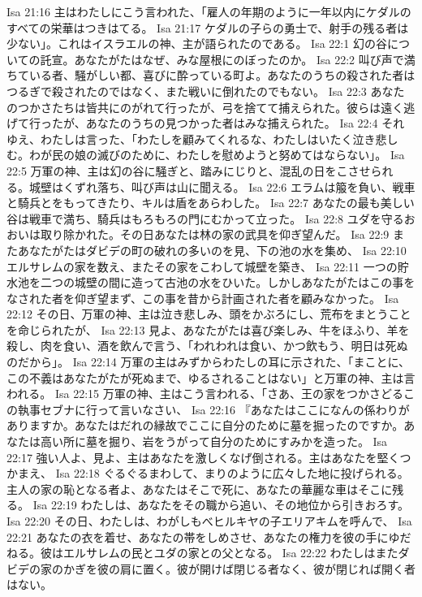 Isa 21:16  主はわたしにこう言われた、「雇人の年期のように一年以内にケダルのすべての栄華はつきはてる。
Isa 21:17  ケダルの子らの勇士で、射手の残る者は少ない」。これはイスラエルの神、主が語られたのである。
Isa 22:1  幻の谷についての託宣。あなたがたはなぜ、みな屋根にのぼったのか。
Isa 22:2  叫び声で満ちている者、騒がしい都、喜びに酔っている町よ。あなたのうちの殺された者はつるぎで殺されたのではなく、また戦いに倒れたのでもない。
Isa 22:3  あなたのつかさたちは皆共にのがれて行ったが、弓を捨てて捕えられた。彼らは遠く逃げて行ったが、あなたのうちの見つかった者はみな捕えられた。
Isa 22:4  それゆえ、わたしは言った、「わたしを顧みてくれるな、わたしはいたく泣き悲しむ。わが民の娘の滅びのために、わたしを慰めようと努めてはならない」。
Isa 22:5  万軍の神、主は幻の谷に騒ぎと、踏みにじりと、混乱の日をこさせられる。城壁はくずれ落ち、叫び声は山に聞える。
Isa 22:6  エラムは箙を負い、戦車と騎兵とをもってきたり、キルは盾をあらわした。
Isa 22:7  あなたの最も美しい谷は戦車で満ち、騎兵はもろもろの門にむかって立った。
Isa 22:8  ユダを守るおおいは取り除かれた。その日あなたは林の家の武具を仰ぎ望んだ。
Isa 22:9  またあなたがたはダビデの町の破れの多いのを見、下の池の水を集め、
Isa 22:10  エルサレムの家を数え、またその家をこわして城壁を築き、
Isa 22:11  一つの貯水池を二つの城壁の間に造って古池の水をひいた。しかしあなたがたはこの事をなされた者を仰ぎ望まず、この事を昔から計画された者を顧みなかった。
Isa 22:12  その日、万軍の神、主は泣き悲しみ、頭をかぶろにし、荒布をまとうことを命じられたが、
Isa 22:13  見よ、あなたがたは喜び楽しみ、牛をほふり、羊を殺し、肉を食い、酒を飲んで言う、「われわれは食い、かつ飲もう、明日は死ぬのだから」。
Isa 22:14  万軍の主はみずからわたしの耳に示された、「まことに、この不義はあなたがたが死ぬまで、ゆるされることはない」と万軍の神、主は言われる。
Isa 22:15  万軍の神、主はこう言われる、「さあ、王の家をつかさどるこの執事セブナに行って言いなさい、
Isa 22:16  『あなたはここになんの係わりがありますか。あなたはだれの縁故でここに自分のために墓を掘ったのですか。あなたは高い所に墓を掘り、岩をうがって自分のためにすみかを造った。
Isa 22:17  強い人よ、見よ、主はあなたを激しくなげ倒される。主はあなたを堅くつかまえ、
Isa 22:18  ぐるぐるまわして、まりのように広々した地に投げられる。主人の家の恥となる者よ、あなたはそこで死に、あなたの華麗な車はそこに残る。
Isa 22:19  わたしは、あなたをその職から追い、その地位から引きおろす。
Isa 22:20  その日、わたしは、わがしもべヒルキヤの子エリアキムを呼んで、
Isa 22:21  あなたの衣を着せ、あなたの帯をしめさせ、あなたの権力を彼の手にゆだねる。彼はエルサレムの民とユダの家との父となる。
Isa 22:22  わたしはまたダビデの家のかぎを彼の肩に置く。彼が開けば閉じる者なく、彼が閉じれば開く者はない。
